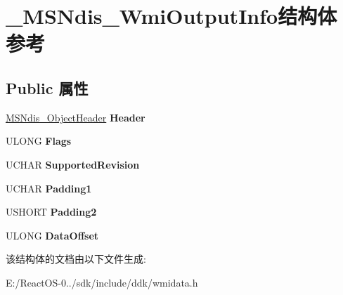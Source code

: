 \hypertarget{struct___m_s_ndis___wmi_output_info}{}\section{\+\_\+\+M\+S\+Ndis\+\_\+\+Wmi\+Output\+Info结构体 参考}
\label{struct___m_s_ndis___wmi_output_info}
\subsection*{Public 属性}
\begin{DoxyCompactItemize}
\item 
\mbox{\label{struct___m_s_ndis___wmi_output_info_a7d1343712b892b9c3011bd8200bac7e8}} 
\hyperlink{struct___m_s_ndis___object_header}{M\+S\+Ndis\+\_\+\+Object\+Header} {\bfseries Header}
\item 
\mbox{\label{struct___m_s_ndis___wmi_output_info_ade509a4d965a822f7f34fbe6c3fe4007}} 
U\+L\+O\+NG {\bfseries Flags}
\item 
\mbox{\label{struct___m_s_ndis___wmi_output_info_a69f36eddb4c474213fbb60fd10c97cb9}} 
U\+C\+H\+AR {\bfseries Supported\+Revision}
\item 
\mbox{\label{struct___m_s_ndis___wmi_output_info_a8950ddf6bca15ef07e3f3940014e54f3}} 
U\+C\+H\+AR {\bfseries Padding1}
\item 
\mbox{\label{struct___m_s_ndis___wmi_output_info_adb77181aa4b9ac719d5fe0800e6b064e}} 
U\+S\+H\+O\+RT {\bfseries Padding2}
\item 
\mbox{\label{struct___m_s_ndis___wmi_output_info_adef76655287a8d4aab0590a9dd7d640a}} 
U\+L\+O\+NG {\bfseries Data\+Offset}
\end{DoxyCompactItemize}


该结构体的文档由以下文件生成\+:\begin{DoxyCompactItemize}
\item 
E\+:/\+React\+O\+S-\/0../sdk/include/ddk/wmidata.\+h\end{DoxyCompactItemize}
